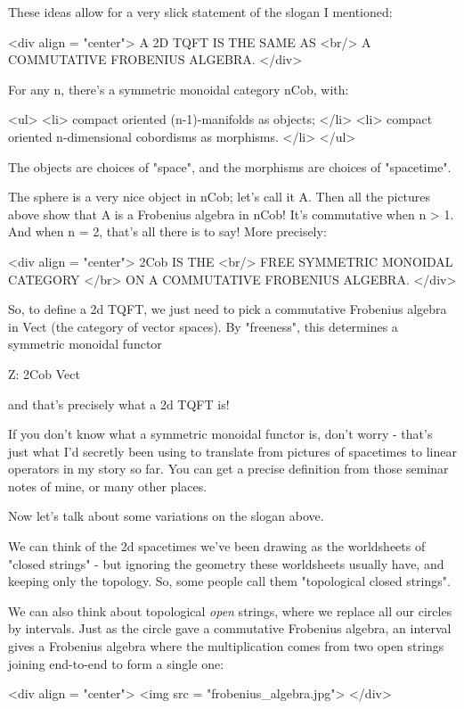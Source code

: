 These ideas allow for a very slick statement of the slogan I 
mentioned:

<div align = "center">
                    A 2D TQFT IS THE SAME AS <br/>
                A COMMUTATIVE FROBENIUS ALGEBRA.
</div>

For any n, there's a symmetric monoidal category nCob, with: 

<ul>
<li>
 compact oriented (n-1)-manifolds as objects; 
</li>
<li>
 compact oriented n-dimensional cobordisms as morphisms. 
</li>
</ul>

The objects are choices of "space", and the morphisms are
choices of "spacetime".

The sphere is a very nice object in nCob; let's call it A.  Then all 
the pictures above show that A is a Frobenius algebra in nCob!  It's 
commutative when n > 1.  And when n = 2, that's all there is to say!  
More precisely:

<div align = "center">
                          2Cob IS THE <br/>
                FREE SYMMETRIC MONOIDAL CATEGORY </br>
              ON A COMMUTATIVE FROBENIUS ALGEBRA.
</div>

So, to define a 2d TQFT, we just need to pick a commutative Frobenius
algebra in Vect (the category of vector spaces).  By
"freeness", this determines a symmetric monoidal functor

Z: 2Cob \to  Vect

and that's precisely what a 2d TQFT is!  

If you don't know what a symmetric monoidal functor is, don't worry - 
that's just what I'd secretly been using to translate from pictures 
of spacetimes to linear operators in my story so far.  You can get a
precise definition from those seminar notes of mine, or many other 
places. 

Now let's talk about some variations on the slogan above.

We can think of the 2d spacetimes we've been drawing as the
worldsheets of "closed strings" - but ignoring the geometry
these worldsheets usually have, and keeping only the topology.  So,
some people call them "topological closed strings".

We can also think about topological \emph{open} strings, where we
replace all our circles by intervals.  Just as the circle gave a
commutative Frobenius algebra, an interval gives a Frobenius algebra
where the multiplication comes from two open strings joining
end-to-end to form a single one:

<div align = "center">
<img src = "frobenius_algebra.jpg">
</div>

